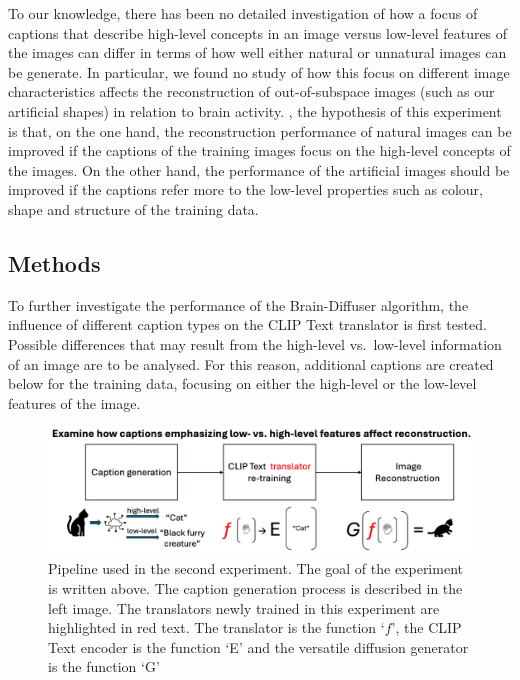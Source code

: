 To our knowledge, there has been no detailed investigation of how a focus of captions that describe high-level concepts in an image versus low-level features of the images can differ in terms of how well either natural or unnatural images can be generate. In particular, we found no study of how this focus on different image characteristics affects the reconstruction of out-of-subspace images (such as our artificial shapes) in relation to brain activity. , the hypothesis of this experiment is that, on the one hand, the reconstruction performance of natural images can be improved if the captions of the training images focus on the high-level concepts of the images. On the other hand, the performance of the artificial images should be improved if the captions refer more to the low-level properties such as colour, shape and structure of the training data.


\subsection{Methods}
To further investigate the performance of the Brain-Diffuser algorithm, the influence of different caption types on the CLIP Text translator is first tested. Possible differences that may result from the high-level vs.\ low-level information of an image are to be analysed. For this reason, additional captions are created below for the training data, focusing on either the high-level or the low-level features of the image. 

\begin{figure}[ht]
  \centering
  \includegraphics[width=1\textwidth]{plots/pipeline_exp2.png}
  \caption[Experiment 2: Pipeline]{Pipeline used in the second experiment. The goal of the experiment is written above. The caption generation process is described in the left image. The translators newly trained in this experiment are highlighted in red text. The translator is the function `$f$', the CLIP Text encoder is the function `E' and the versatile diffusion generator is the function `G'}\label{fig:aicap_pipeline}
\end{figure}

